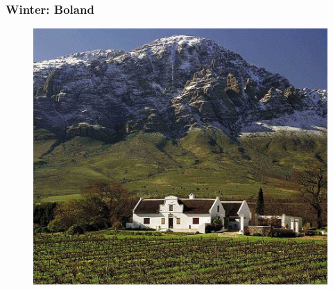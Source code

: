\documentclass[8pt]{beamer}
\begin{document}
\begin{frame}
	\frametitle{Winter: Boland}
	\begin{figure}[H]
		\includegraphics[scale=0.6]{wynland}
	\end{figure}
\end{frame}
\end{document}
